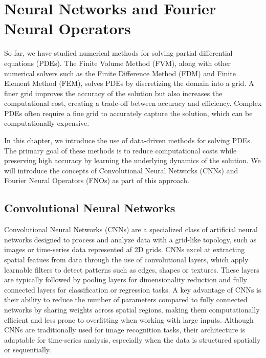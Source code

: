 \chapter{Neural Networks and Fourier Neural Operators}\label{ch:FNO+NN}
So far, we have studied numerical methods for solving partial differential equations (PDEs).
The Finite Volume Method (FVM), along with other numerical solvers such as the Finite Difference Method (FDM) and Finite Element Method (FEM), solves PDEs by discretizing the domain into a grid.
A finer grid improves the accuracy of the solution but also increases the computational cost, creating a trade-off between accuracy and efficiency.
Complex PDEs often require a fine grid to accurately capture the solution, which can be computationally expensive.

In this chapter, we introduce the use of data-driven methods for solving PDEs.
The primary goal of these methods is to reduce computational costs while preserving high accuracy by learning the underlying dynamics of the solution.
We will introduce the concepts of Convolutional Neural Networks (CNNs) and Fourier Neural Operators (FNOs) as part of this approach.

\section{Convolutional Neural Networks}
Convolutional Neural Networks (CNNs) are a specialized class of artificial neural networks designed to process and analyze data with a grid-like topology, such as images or time-series data represented af 2D grids.
CNNs excel at extracting spatial featues from data through the use of convolutional layers, which apply learnable filters to detect patterns such as edges, shapes or textures.
These layers are typically followed by pooling layers for dimensionality reduction and fully connected layers for classification or regression tasks.
A key advantage of CNNs is their ability to reduce the number of parameters compared to fully connected networks by sharing weights across spatial regions, making them computationally efficient and less prone to overfitting when working with large inputs.
Although CNNs are traditionally used for image recognition tasks, their architecture is adaptable for time-series analysis, especially when the data is structured spatially or sequentially.

